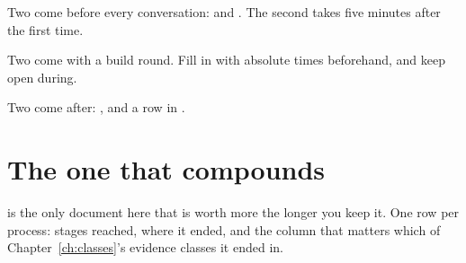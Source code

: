 Two come before every conversation:  and
. The second takes five minutes after the first time.

Two come with a build round. Fill in  with absolute times
beforehand, and keep  open during.

Two come after: , and a row in .

\section{The one that compounds}

 is the only document here that is worth more the
longer you keep it. One row per process: stages reached, where it ended, and
\dash{} the column that matters \dash{} which of Chapter~\ref{ch:classes}'s
evidence classes it ended in.

